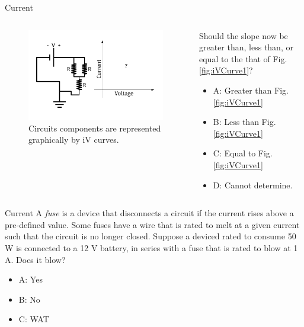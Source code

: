 \documentclass{beamer}
\begin{document}
\begin{frame}{Current}
\begin{columns}[T]
\begin{column}{0.5\textwidth}
\begin{figure}
\centering
\includegraphics[width=\textwidth,trim=0.5cm 0cm 1cm 0cm,clip=true]{figures/iVCurve4.pdf}
\caption{\label{fig:iVCurve4} Circuits components are represented graphically by iV curves.}
\end{figure}
\end{column}
\begin{column}{0.5\textwidth}
\small
Should the slope now be greater than, less than, or equal to the that of Fig. \ref{fig:iVCurve1}?
\begin{itemize}
\item A: Greater than Fig. \ref{fig:iVCurve1}
\item B: Less than Fig. \ref{fig:iVCurve1}
\item C: Equal to Fig. \ref{fig:iVCurve1}
\item D: Cannot determine.
\end{itemize}
\end{column}
\end{columns}
\end{frame}

\begin{frame}{Current}
A \textit{fuse} is a device that disconnects a circuit if the current rises above a pre-defined value.  Some fuses have a wire that is rated to melt at a given current such that the circuit is no longer closed.  Suppose a deviced rated to consume 50 W is connected to a 12 V battery, in series with a fuse that is rated to blow at 1 A.  Does it blow?
\begin{itemize}
\item A: Yes
\item B: No
\item C: WAT
\end{itemize}
\end{frame}
\end{document}
